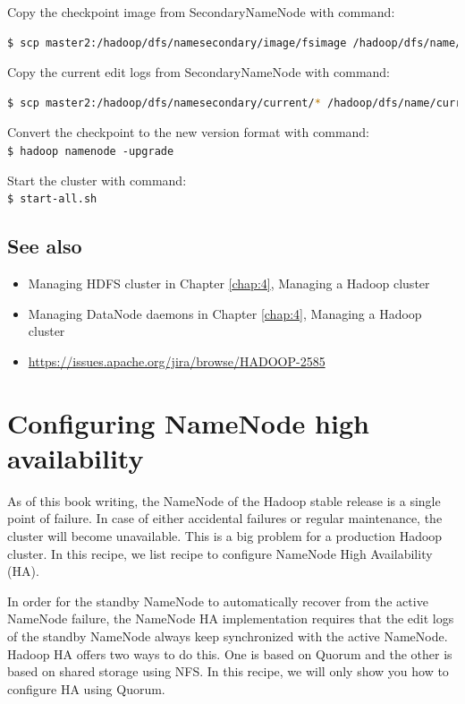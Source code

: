 Copy the checkpoint image from SecondaryNameNode with command:
\lstset{style=bashstyle}
\begin{lstlisting}[language=bash]
$ scp master2:/hadoop/dfs/namesecondary/image/fsimage /hadoop/dfs/name/fsimage
\end{lstlisting}

Copy the current edit logs from SecondaryNameNode with command:
\lstset{style=bashstyle}
\begin{lstlisting}[language=bash]
$ scp master2:/hadoop/dfs/namesecondary/current/* /hadoop/dfs/name/current
\end{lstlisting}

Convert the checkpoint to the new version format with command: \\
\verb|$ hadoop namenode -upgrade|

Start the cluster with command: \\
\verb|$ start-all.sh|

\subsection*{See also}
\begin{itemize}
  \item Managing HDFS cluster in Chapter \ref{chap:4}, Managing a Hadoop cluster
  \item Managing DataNode daemons in Chapter \ref{chap:4}, Managing a Hadoop cluster
  \item \url{https://issues.apache.org/jira/browse/HADOOP-2585}
\end{itemize}

\section{Configuring NameNode high availability}
As of this book writing, the NameNode of the Hadoop stable release is a single point of failure. In case of either accidental failures or regular maintenance, the cluster will become unavailable. This is a big problem for a production Hadoop cluster. In this recipe, we list recipe to configure NameNode High Availability (HA).

In order for the standby NameNode to automatically recover from the active NameNode failure, the NameNode HA implementation requires that the edit logs of the standby NameNode always keep synchronized with the active NameNode. Hadoop HA offers two ways to do this. One is based on Quorum and the other is based on shared storage using NFS. In this recipe, we will only show you how to configure HA using Quorum.
